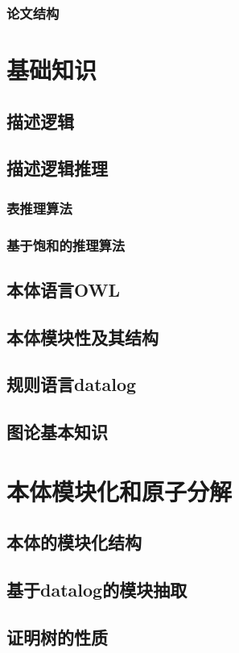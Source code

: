 \subsection{论文结构}

\chapter{基础知识}
\section{描述逻辑}
\section{描述逻辑推理}
\subsection{表推理算法}
\subsection{基于饱和的推理算法}
\section{本体语言OWL}
\section{本体模块性及其结构}
\section{规则语言datalog}
\section{图论基本知识}


\chapter{本体模块化和原子分解}
\section{本体的模块化结构}
\section{基于datalog的模块抽取}
\section{证明树的性质}
